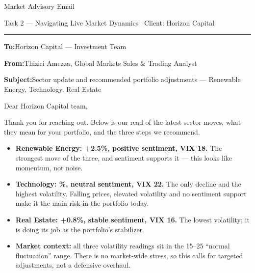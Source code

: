 \documentclass[11pt]{article}
\newcommand{\emailfield}[2]{\textbf{\color{navy}#1}\quad #2\par}
\begin{document}
{\LARGE Market Advisory Email}\par\medskip
{\large Task 2 --- Navigating Live Market Dynamics \textperiodcentered\ Client:
Horizon Capital}\par
{\color{rulegray}\rule{\linewidth}{0.6pt}}\par\medskip

\begin{tcolorbox}[enhanced, colback=boxgray, frame hidden, arc=2mm,
    left=5mm, right=5mm, top=3mm, bottom=3mm]
\emailfield{To:}{Horizon Capital --- Investment Team}
\emailfield{From:}{Thiziri Amezza, Global Markets Sales \& Trading Analyst}
\emailfield{Subject:}{Sector update and recommended portfolio adjustments ---
Renewable Energy, Technology, Real Estate}
\end{tcolorbox}
\medskip

Dear Horizon Capital team,

Thank you for reaching out. Below is our read of the latest sector moves, what
they mean for your portfolio, and the three steps we recommend.

\begin{itemize}[leftmargin=1.5em, itemsep=3pt]
  \item \textbf{Renewable Energy: +2.5\%, positive sentiment, VIX 18.} The
  strongest move of the three, and sentiment supports it --- this looks like
  momentum, not noise.
  \item \textbf{Technology: \%, neutral sentiment, VIX 22.} The
  only decline and the highest volatility. Falling prices, elevated volatility
  and no sentiment support make it the main risk in the portfolio today.
  \item \textbf{Real Estate: +0.8\%, stable sentiment, VIX 16.} The lowest
  volatility; it is doing its job as the portfolio's stabilizer.
  \item \textbf{Market context:} all three volatility readings sit in the
  15--25 ``normal fluctuation'' range. There is no market-wide stress, so this
  calls for targeted adjustments, not a defensive overhaul.
\end{itemize}
\end{document}
